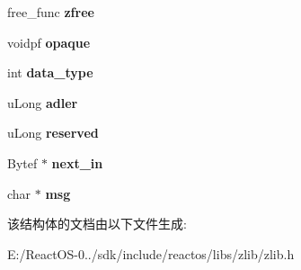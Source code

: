 \begin{DoxyCompactItemize}
\item 
\mbox{\label{structz__stream__s_a89eb750ade7f4f0b56bfdadf13344982}} 
free\+\_\+func {\bfseries zfree}
\item 
\mbox{\label{structz__stream__s_ab72467f908d2ce65d5b42ee6556ef8bb}} 
voidpf {\bfseries opaque}
\item 
\mbox{\label{structz__stream__s_a9d8f63877d7639a8bca60f9fc3704fc4}} 
int {\bfseries data\+\_\+type}
\item 
\mbox{\label{structz__stream__s_ade2217fe31e671be1257731883201223}} 
u\+Long {\bfseries adler}
\item 
\mbox{\label{structz__stream__s_add73791dd19b49c9c68f3f3d328c37db}} 
u\+Long {\bfseries reserved}
\item 
\mbox{\label{structz__stream__s_a21d2c026f0f2fcd67f33011231f8ed00}} 
Bytef $\ast$ {\bfseries next\+\_\+in}
\item 
\mbox{\label{structz__stream__s_a9b2f745fc780e3b33e2935f8c650a326}} 
char $\ast$ {\bfseries msg}
\end{DoxyCompactItemize}


该结构体的文档由以下文件生成\+:\begin{DoxyCompactItemize}
\item 
E\+:/\+React\+O\+S-\/0../sdk/include/reactos/libs/zlib/zlib.\+h\end{DoxyCompactItemize}
